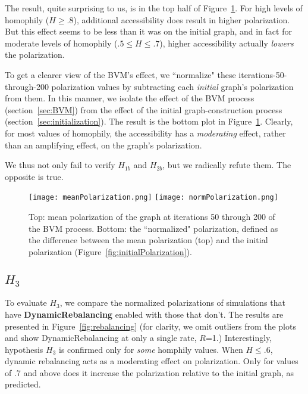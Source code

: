 The result, quite surprising to us, is in the top half of
Figure~\ref{fig:meanNormPolarization}. For high levels of homophily
($H\geq.8$), additional accessibility does result in higher polarization. But
this effect seems to be less than it was on the initial graph, and in fact for
moderate levels of homophily ($.5 \leq H \leq .7$), higher accessibility
actually \textit{lowers} the polarization. 

To get a clearer view of the BVM's effect, we ``normalize" these
iterations-50-through-200 polarization values by subtracting each
\textit{initial} graph's polarization from them. In this manner, we isolate
the effect of the BVM process (section~\ref{sec:BVM}) from the effect of the
initial graph-construction process (section~\ref{sec:initialization}). The
result is the bottom plot in Figure~\ref{fig:meanNormPolarization}. Clearly,
for most values of homophily, the accessibility has a \textit{moderating}
effect, rather than an amplifying effect, on the graph's polarization. 

We thus not only fail to verify $H_{1b}$ and $H_{2b}$, but we radically refute
them. The opposite is true.

\begin{figure}
\centering
\texttt{[image: meanPolarization.png]}
\texttt{[image: normPolarization.png]}

\caption{Top: mean polarization of the graph at iterations 50 through 200
of the BVM process. Bottom: the ``normalized" polarization, defined as the
difference between the mean polarization (top) and the initial polarization
(Figure~\ref{fig:initialPolarization}).}
\label{fig:meanNormPolarization}
\end{figure}

\subsection{$H_{3}$}

To evaluate $H_3$, we compare the normalized polarizations of simulations that
have \textbf{DynamicRebalancing} enabled with those that don't. The results
are presented in Figure~\ref{fig:rebalancing} (for clarity, we omit outliers
from the plots and show DynamicRebalancing at only a single rate, $R$=1.)
Interestingly, hypothesis $H_3$ is confirmed only for \textit{some} homphily
values. When $H\leq.6$, dynamic rebalancing acts as a moderating effect on
polarization. Only for values of .7 and above does it increase the
polarization relative to the initial graph, as predicted. 

